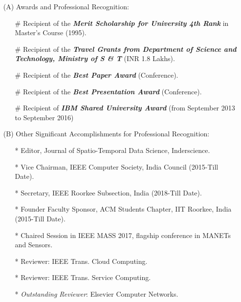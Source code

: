 \begin{itemize}
\item[(A)]  Awards and Professional Recognition:

\begin{itemize}
	\item[\#]
	Recipient of the \emph{\textbf{Merit Scholarship for University 4th Rank}}
	in Master's Course (1995).
	
	\item[\#]
	Recipient of the \emph{\textbf{Travel Grants from Department of Science and Technology, Ministry of S \& T}}
	(INR 1.8 Lakhs).
	
	\item[\#]
	Recipient of the \emph{\textbf{Best Paper Award}} (Conference).
	
	\item[\#]
	Recipient of the \emph{\textbf{Best Presentation Award}} (Conference).

	\item[\#]
	Recipient of \textbf{\textit{IBM Shared University Award}} (from September 2013 to September 2016)
\end{itemize}

\item[(B)] Other Significant Accomplishments for Professional Recognition: 

\begin{itemize}
	\item[*] Editor, Journal of Spatio-Temporal Data Science, Inderscience.

	\item[*] Vice Chairman, IEEE Computer Society, India Council (2015-Till Date).

	\item[*] Secretary, IEEE Roorkee Subsection, India (2018-Till Date).

	\item[*] Founder Faculty Sponsor, ACM Students Chapter, IIT Roorkee, India (2015-Till Date).
	
	\item[*] Chaired Session in IEEE MASS 2017, flagship conference in MANETs and Sensors.
		
	\item[*] Reviewer: IEEE Trans. Cloud Computing.
	
	\item[*] Reviewer: IEEE Trans. Service Computing.
	
	\item[*] \textit{ Outstanding Reviewer}: Elsevier Computer Networks.


\end{itemize}
\end{itemize}
